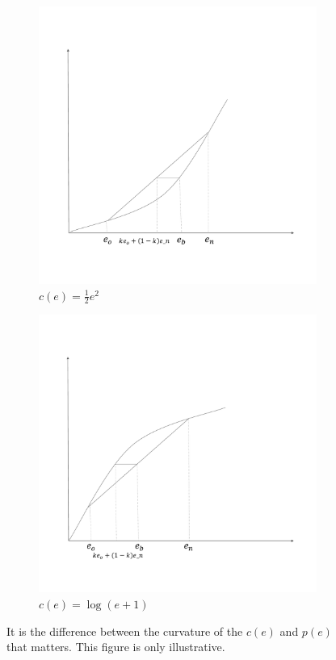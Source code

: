 \documentclass[12pt]{article}
\begin{document}
\begin{figure}[htbp]
    \centering
    \begin{subfigure}[t]{0.45\textwidth}
        \centering
        \includegraphics[width=\textwidth]{../Figures/fig1.pdf}
        \caption{$c(e) = \frac{1}{2}e^2$}
    \end{subfigure}
    \begin{subfigure}[t]{0.45\textwidth}
        \centering
        \includegraphics[width=\textwidth]{../Figures/fig2.pdf}
        \caption{$c(e) = \log(e+1)$}
    \end{subfigure}
    \caption{It is the difference between the curvature of the $c(e)$ and $p(e)$ that matters. This figure is only illustrative.}
    \label{fig:cost_function}

\end{figure}
\end{document}
